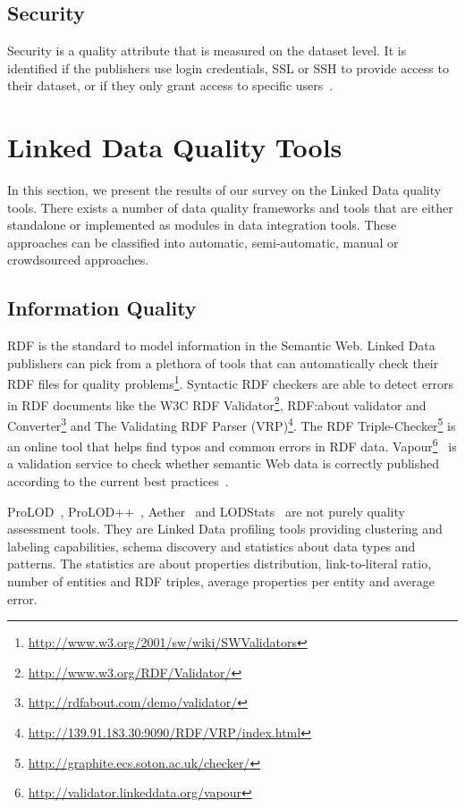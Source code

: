 \documentclass[onecolumn, crcready]{../../Tools/LaTEX/iosart2c}
\begin{document}
\subsection{Security}
Security is a quality attribute that is measured on the dataset level. It is identified if the publishers use login credentials, SSL or SSH to provide access to their dataset, or if they only grant access to specific users~\cite{Zaveri:SemWebJorunal:12}.


\section{Linked Data Quality Tools}
\label{sec:quality-tools}
In this section, we present the results of our survey on the Linked Data quality tools. There exists a number of data quality frameworks and tools that are either standalone or implemented as modules in data integration tools. These approaches can be classified into automatic, semi-automatic, manual or crowdsourced approaches.

\subsection{Information Quality}
RDF is the standard to model information in the Semantic Web. Linked Data publishers can pick from a plethora of tools that can automatically check their RDF files for quality problems\footnote{\url{http://www.w3.org/2001/sw/wiki/SWValidators}}. Syntactic RDF checkers are able to detect errors in RDF documents like the W3C RDF Validator\footnote{\url{http://www.w3.org/RDF/Validator/}}, RDF:about validator and Converter\footnote{\url{http://rdfabout.com/demo/validator/}} and The Validating RDF Parser (VRP)\footnote{\url{http://139.91.183.30:9090/RDF/VRP/index.html}}. The RDF Triple-Checker\footnote{\url{http://graphite.ecs.soton.ac.uk/checker/}} is an online tool that helps find typos and common errors in RDF data. Vapour\footnote{\url{http://validator.linkeddata.org/vapour}}~\cite{Berrueta:SFSW:08} is a validation service to check whether semantic Web data is correctly published according to the current best practices~\cite{Berners-Lee:W3C:06}.

ProLOD~\cite{Bohm:ICDEW:10}, ProLOD++~\cite{Abedjan:ICDE:14}, Aether~\cite{Makela:ESWC:14} and LODStats~\cite{Auer:EKAW:12} are not purely quality assessment tools. They are Linked Data profiling tools providing clustering and labeling capabilities, schema discovery and statistics about data types and patterns. The statistics are about properties distribution, link-to-literal ratio, number of entities and RDF triples, average properties per entity and average error.
\end{document}

